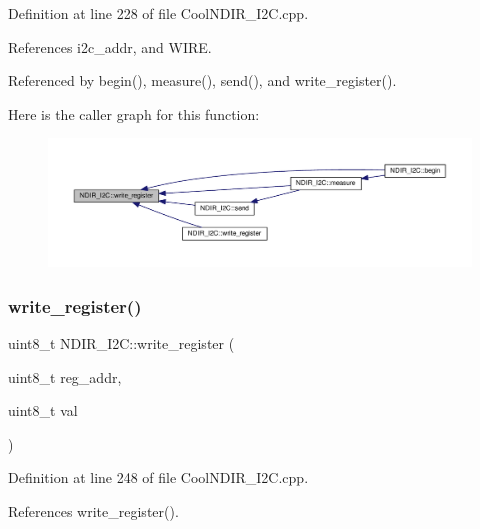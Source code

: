 Definition at line 228 of file Cool\+N\+D\+I\+R\+\_\+\+I2\+C.\+cpp.



References i2c\+\_\+addr, and W\+I\+RE.



Referenced by begin(), measure(), send(), and write\+\_\+register().

Here is the caller graph for this function\+:\nopagebreak
\begin{figure}[H]
\begin{center}
\leavevmode
\includegraphics[width=350pt]{d6/ddb/class_n_d_i_r___i2_c_a5de6a044b00e985f035edca07521e319_icgraph}
\end{center}
\end{figure}
\mbox{\label{class_n_d_i_r___i2_c_a8ad2a76f9866b0a1f34810a147b4b20d}} 
\subsubsection{\texorpdfstring{write\+\_\+register()}{write\_register()}\hspace{0.1cm}{\footnotesize\ttfamily [2/2]}}
{\footnotesize\ttfamily uint8\+\_\+t N\+D\+I\+R\+\_\+\+I2\+C\+::write\+\_\+register (\begin{DoxyParamCaption}\item[{uint8\+\_\+t}]{reg\+\_\+addr,  }\item[{uint8\+\_\+t}]{val }\end{DoxyParamCaption})\hspace{0.3cm}{\ttfamily [private]}}



Definition at line 248 of file Cool\+N\+D\+I\+R\+\_\+\+I2\+C.\+cpp.



References write\+\_\+register().

